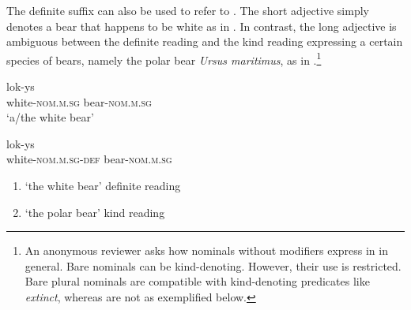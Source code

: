 \documentclass[output=paper,
modfonts
]{langscibook}
\begin{document}
The definite suffix can also be used to refer to  \citep{Rutkowski06}. The short adjective simply denotes a bear that happens to be white as in . In contrast, the long adjective is ambiguous between the definite reading and the kind reading expressing a certain species of bears, namely the polar bear \textit{Ursus maritimus}, as in .\footnote{An anonymous reviewer asks how nominals without modifiers express  in  in general. Bare nominals can be kind-denoting. However, their use is restricted. Bare plural nominals are compatible with kind-denoting predicates like \textit{extinct}, whereas  are not as exemplified below.	
\ea {}

\z
\z\vspace*{-\baselineskip}}

\begin{exe}
\ex \label{ex:sereikaite:11}
\begin{xlist}
\ex \label{ex:sereikaite:11a}
 {lok-ys} \\
white-\textsc{nom.m.sg} bear-\textsc{nom.m.sg} \\
\trans `a/the white bear'  

\ex \label{ex:sereikaite:11b}
 {lok-ys}\\
white-\textsc{nom.m.sg}-\textsc{def} bear-\textsc{nom.m.sg}  \\
\trans 
\begin{enumerate}[label=(\roman*)]
	\item `the white bear' \checkmark definite reading 
	\item `the polar bear' \checkmark kind reading
\end{enumerate}
 
\end{xlist}
\end{exe}
\end{document}
